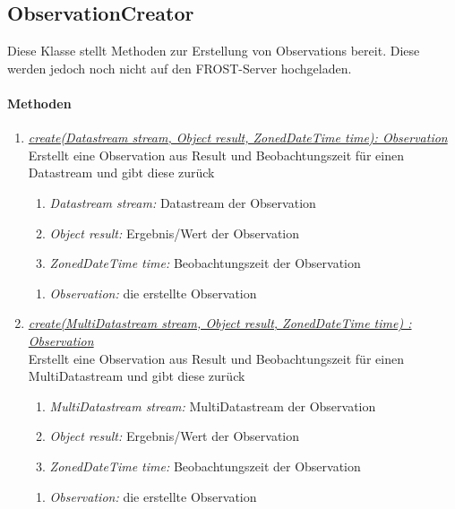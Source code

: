 
\subsection{ObservationCreator}

Diese Klasse stellt Methoden zur Erstellung von Observations bereit.
Diese werden jedoch noch nicht auf den FROST-Server hochgeladen.

\paragraph{Methoden}

\begin{enumerate}[+]

	\item \underline{\textit{create(Datastream stream, Object result, ZonedDateTime time): Observation}} \\
	Erstellt eine Observation aus Result und Beobachtungszeit für einen Datastream und gibt diese zurück	
	\begin{enumerate}[$\bullet$]
		\item \textit{Datastream stream:} Datastream der Observation
		\item \textit{Object result:} Ergebnis/Wert der Observation
		\item \textit{ZonedDateTime time:} Beobachtungszeit der Observation
	\end{enumerate}
	\vspace{-0.2cm}
	\begin{enumerate}[$\circ$]
		\item \textit{Observation:} die erstellte Observation
	\end{enumerate}
	
	\item \underline{\textit{create(MultiDatastream stream, Object result, ZonedDateTime time) : Observation}} \\
	Erstellt eine Observation aus Result und Beobachtungszeit für einen MultiDatastream und gibt diese zurück	
	\begin{enumerate}[$\bullet$]
		\item \textit{MultiDatastream stream:} MultiDatastream der Observation
		\item \textit{Object result:} Ergebnis/Wert der Observation
		\item \textit{ZonedDateTime time:} Beobachtungszeit der Observation
	\end{enumerate}
	\vspace{-0.2cm}
	\begin{enumerate}[$\circ$]
		\item \textit{Observation:} die erstellte Observation
	\end{enumerate}
	

\end{enumerate}
